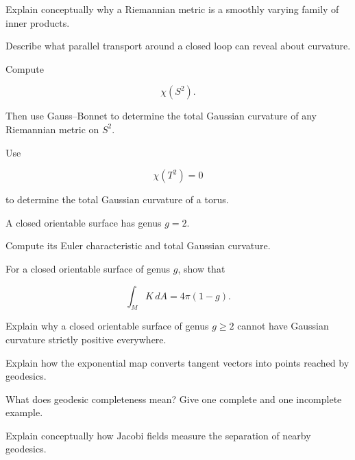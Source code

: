 \begin{exercise}[3]
Explain conceptually why a Riemannian metric is a smoothly varying family of
inner products.
\end{exercise}

\begin{exercise}[3]
Describe what parallel transport around a closed loop can reveal about
curvature.
\end{exercise}

\begin{exercise}[2]
Compute

\[
\chi(S^2).
\]

Then use Gauss--Bonnet to determine the total Gaussian curvature of any
Riemannian metric on \(S^2\).
\end{exercise}

\begin{exercise}[2]
Use

\[
\chi(T^2)=0
\]

to determine the total Gaussian curvature of a torus.
\end{exercise}

\begin{exercise}[2]
A closed orientable surface has genus \(g=2\).

Compute its Euler characteristic and total Gaussian curvature.
\end{exercise}

\begin{exercise}[3]
For a closed orientable surface of genus \(g\), show that

\[
\int_MK\,dA
=
4\pi(1-g).
\]
\end{exercise}

\begin{exercise}[3]
Explain why a closed orientable surface of genus \(g\geq2\) cannot have
Gaussian curvature strictly positive everywhere.
\end{exercise}

\begin{exercise}[3]
Explain how the exponential map converts tangent vectors into points reached
by geodesics.
\end{exercise}

\begin{exercise}[3]
What does geodesic completeness mean?
Give one complete and one incomplete example.
\end{exercise}

\begin{exercise}[3]
Explain conceptually how Jacobi fields measure the separation of nearby
geodesics.
\end{exercise}

